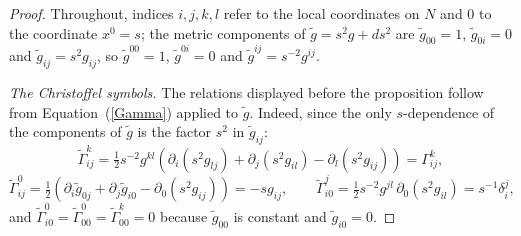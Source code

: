 \begin{proof}
Throughout, indices $i,j,k,l$ refer to the local coordinates on $N$
and $0$ to the coordinate $x^0=s$; the metric components of $\tilde
g=s^2g+ds^2$ are $\tilde g_{00}=1$, $\tilde g_{0i}=0$ and $\tilde
g_{ij}=s^2g_{ij}$, so $\tilde g^{00}=1$, $\tilde g^{0i}=0$ and
$\tilde g^{ij}=s^{-2}g^{ij}$.

\emph{The Christoffel symbols.} The relations displayed before the
proposition follow from Equation~(\ref{Gamma}) applied to $\tilde
g$. Indeed, since the only $s$-dependence of the components of
$\tilde g$ is the factor $s^2$ in $\tilde g_{ij}$:
$$\widetilde\Gamma^k_{ij}
=\tfrac{1}{2}s^{-2}g^{kl}\left(\partial_i(s^2g_{lj})
+\partial_j(s^2g_{il})-\partial_l(s^2g_{ij})\right)=\Gamma^k_{ij},$$
$$\widetilde\Gamma^0_{ij}
=\tfrac{1}{2}\left(\partial_i\tilde g_{0j}+\partial_j\tilde
g_{i0}-\partial_0(s^2g_{ij})\right)=-sg_{ij},\qquad
\widetilde\Gamma^j_{i0}
=\tfrac{1}{2}s^{-2}g^{jl}\,\partial_0(s^2g_{il})=s^{-1}\delta^j_i,$$
and $\widetilde\Gamma^0_{i0}=\widetilde\Gamma^0_{00}
=\widetilde\Gamma^k_{00}=0$ because $\tilde g_{00}$ is constant and
$\tilde g_{i0}=0$.


\end{proof}
